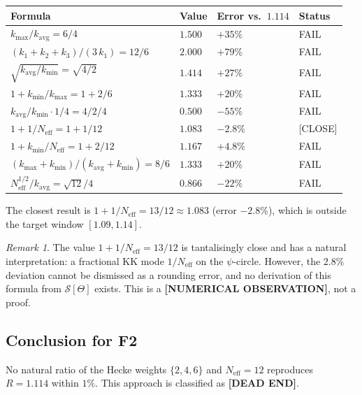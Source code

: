 \documentclass[11pt,a4paper]{article}
\theoremstyle{remark}
\newtheorem{remark}{Remark}
\begin{document}
\begin{center}
\begin{tabular}{llll}
  \toprule
  Formula & Value & Error vs.\ $1.114$ & Status \\
  \midrule
  $k_{\max}/k_{\mathrm{avg}} = 6/4$           & $1.500$  & $+35\%$ & FAIL \\
  $(k_1+k_2+k_3)/(3\,k_1) = 12/6$            & $2.000$  & $+79\%$ & FAIL \\
  $\sqrt{k_{\mathrm{avg}}/k_{\min}} = \sqrt{4/2}$ & $1.414$ & $+27\%$ & FAIL \\
  $1 + k_{\min}/k_{\max} = 1 + 2/6$          & $1.333$  & $+20\%$ & FAIL \\
  $k_{\mathrm{avg}}/k_{\min} \cdot 1/4 = 4/2/4$ & $0.500$ & $-55\%$ & FAIL \\
  $1 + 1/N_{\mathrm{eff}} = 1 + 1/12$        & $1.083$  & $-2.8\%$ & [CLOSE] \\
  $1 + k_{\min}/N_{\mathrm{eff}} = 1 + 2/12$ & $1.167$  & $+4.8\%$ & FAIL \\
  $(k_{\max} + k_{\min})/(k_{\mathrm{avg}}+k_{\min}) = 8/6$ & $1.333$ & $+20\%$ & FAIL \\
  $N_{\mathrm{eff}}^{1/2}/k_{\mathrm{avg}} = \sqrt{12}/4$ & $0.866$ & $-22\%$ & FAIL \\
  \bottomrule
\end{tabular}
\end{center}

The closest result is $1 + 1/N_{\mathrm{eff}} = 13/12 \approx 1.083$
(error $-2.8\%$), which is outside the target window $[1.09, 1.14]$.

\begin{remark}
  The value $1 + 1/N_{\mathrm{eff}} = 13/12$ is tantalisingly close and
  has a natural interpretation: a fractional KK mode $1/N_{\mathrm{eff}}$
  on the $\psi$-circle.  However, the $2.8\%$ deviation cannot be dismissed
  as a rounding error, and no derivation of this formula from
  $\mathcal{S}[\Theta]$ exists.  This is a \textbf{[NUMERICAL OBSERVATION]},
  not a proof.
\end{remark}

\subsection{Conclusion for F2}

No natural ratio of the Hecke weights $\{2,4,6\}$ and $N_{\mathrm{eff}} = 12$
reproduces $R = 1.114$ within $1\%$.  This approach is classified as
\textbf{[DEAD END]}.
\end{document}
